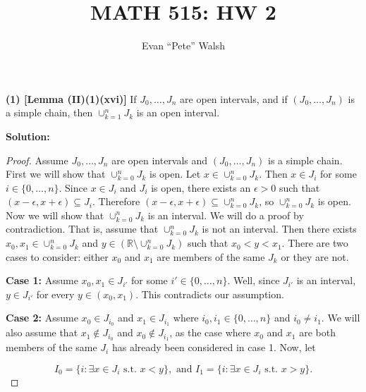 \documentclass[12pt]{article}
\title{MATH 515: HW 2}
\author{Evan ``Pete'' Walsh}
\begin{document}
\maketitle

{\bf (1) [Lemma (II)(1)(xvi)]} If $J_{0}, \dots, J_{n}$ are open intervals, and
if $(J_{0}, \dots, J_{n})$ is a simple chain, then $\cup_{k=1}^{n}J_{k}$ is an
open interval.

{\bf Solution:}

\begin{proof} Assume $J_{0}, \dots, J_{n}$ are open intervals and $(J_{0},
\dots, J_{n})$ is a simple chain. First we will show that $\cup_{k=0}^{n}J_{k}$
is open. Let $x \in \cup_{k=0}^{n}J_{k}$. Then $x\in J_{i}$ for some $i \in
\{0,\dots, n\}$. Since $x\in J_{i}$ and $J_{i}$ is open, there exists an
$\epsilon > 0$ such that $(x-\epsilon, x+\epsilon) \subseteq J_{i}$. Therefore
$(x-\epsilon, x+\epsilon) \subseteq \cup_{k=0}^{n}J_{k}$, so
$\cup_{k=0}^{n}J_{k}$ is open. Now we will show that $\cup_{k=0}^{n}J_{k}$ is an
interval. We will do a proof by contradiction. That is, assume that
$\cup_{k=0}^{n}J_{k}$ is not an interval. Then there exists $x_{0}, x_{1} \in
\cup_{k=0}^{n}J_{k}$ and $y \in (\mathbb{R}\setminus \cup_{k=0}^{n}J_{k})$ such that
$x_{0} < y < x_{1}$. There are two cases to consider: either $x_{0}$ and $x_{1}$
are members of the same $J_{k}$ or they are not.

{\bf Case 1:} Assume $x_{0}, x_{1} \in J_{i'}$ for some $i' \in \{0, \dots,
n\}$. Well, since $J_{i'}$ is an interval, $y \in J_{i'}$ for every $y \in
(x_{0}, x_{1})$. This contradicts our assumption.

{\bf Case 2:} Assume $x_{0} \in J_{i_{0}}$ and $x_{1} \in J_{i_{1}}$ where
$i_{0}, i_{1} \in \{0, \dots, n\}$ and $i_{0} \neq i_{1}$. We will also assume
that $x_{1} \notin J_{i_{0}}$ and $x_{0} \notin J_{i_{1}}$, as the case where $x_{0}$ and $x_{1}$ are both members of the same $J_{i}$ has
already been considered in case 1. Now, let 

\[ I_{0} = \{i : \exists x \in J_{i} \text{ s.t. } x < y\}, \text{ and } I_{1} =
\{ i : \exists x \in J_{i} \text{ s.t. } x > y\}. \] 


\end{proof}
\end{document}
